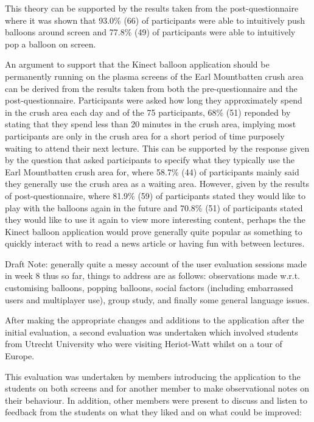 This theory can be supported by the results taken from the post-questionnaire where it was shown that 93.0\% (66) of participants were able to intuitively push balloons around screen and 77.8\% (49) of participants were able to intuitively pop a balloon on screen.

An argument to support that the Kinect balloon application should be permanently running on the  plasma screens of the Earl Mountbatten crush area can be derived from the results taken from both the pre-questionnaire and the post-questionnaire. Participants were asked how long they approximately spend in the crush area each day and of the 75 participants, 68\% (51) reponded by stating that they spend less than 20 minutes in the crush area, implying most participants are only in the crush area for a short period of time purposely waiting to attend their next lecture. This can be supported by the response given by the question that asked participants to specify what they typically use the Earl Mountbatten crush area for, where 58.7\% (44) of participants mainly said they generally use the crush area as a waiting area. However, given by the results of post-questionnaire, where 81.9\% (59) of participants stated they would like to play with the balloons again in the future and 70.8\% (51) of participants stated they would like to use it again to view more interesting content, perhaps the the Kinect balloon application would prove generally quite popular as something to quickly interact with to read a news article or having fun with between lectures.

Draft Note: generally quite a messy account of the user evaluation sessions made in week 8 thus so far, things to address are as follows: observations made w.r.t. customising balloons, popping balloons, social factors (including embarrassed users and multiplayer use), group study, and finally some general language issues.



\clearpage{}

After making the appropriate changes and additions to the application after the initial evaluation, a second evaluation was undertaken which involved students from Utrecht University who were visiting Heriot-Watt whilst on a tour of Europe.

This evaluation was undertaken by members introducing the application to the students on both screens and for another member to make observational notes on their behaviour. In addition, other members were present to discuss and listen to feedback from the students on what they liked and on what could be improved:

